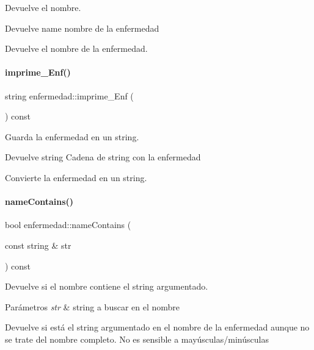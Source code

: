 Devuelve el nombre. 

\begin{DoxyReturn}{Devuelve}
name nombre de la enfermedad
\end{DoxyReturn}
Devuelve el nombre de la enfermedad. \hypertarget{classenfermedad_a125bc2a3705be349859825b230b2652c}{}\label{classenfermedad_a125bc2a3705be349859825b230b2652c} 
\paragraph{\texorpdfstring{imprime\+\_\+\+Enf()}{imprime\_Enf()}}
{\footnotesize\ttfamily string enfermedad\+::imprime\+\_\+\+Enf (\begin{DoxyParamCaption}{ }\end{DoxyParamCaption}) const}



Guarda la enfermedad en un string. 

\begin{DoxyReturn}{Devuelve}
string Cadena de string con la enfermedad
\end{DoxyReturn}
Convierte la enfermedad en un string. \hypertarget{classenfermedad_a430d035077d6acff0b1ddbd07c2ff205}{}\label{classenfermedad_a430d035077d6acff0b1ddbd07c2ff205} 
\paragraph{\texorpdfstring{name\+Contains()}{nameContains()}}
{\footnotesize\ttfamily bool enfermedad\+::name\+Contains (\begin{DoxyParamCaption}\item[{const string \&}]{str }\end{DoxyParamCaption}) const}



Devuelve si el nombre contiene el string argumentado. 


\begin{DoxyParams}{Parámetros}
{\em str} & string a buscar en el nombre\\
\hline
\end{DoxyParams}
Devuelve si está el string argumentado en el nombre de la enfermedad aunque no se trate del nombre completo. No es sensible a mayúsculas/minúsculas \hypertarget{classenfermedad_a9315018e351b2c435129eaccfab97c7f}{}\label{classenfermedad_a9315018e351b2c435129eaccfab97c7f} 
